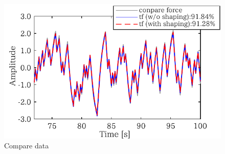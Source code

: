 \begin{figure}[t]
    \centering
        \includegraphics[keepaspectratio, scale=1.0]{contents/システム同定/figure/1018Mseq_compare.pdf}
        \caption{Compare data}
        \label{fig:1018Mseq_compare}
\end{figure}

\clearpage
